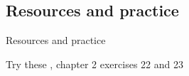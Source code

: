 \documentclass{beamer}
\newcommand{\subonefour}{Resources and practice}
\begin{document}
    \subsection{\subonefour}
      \begin{frame}{\subonefour}
        \begin{block}{}
          
        \end{block}
        \begin{block}{Try these}
          \textcite{dawson_language_2016}, chapter 2 exercises 22 and 23
        \end{block}
      \end{frame}
\end{document}
